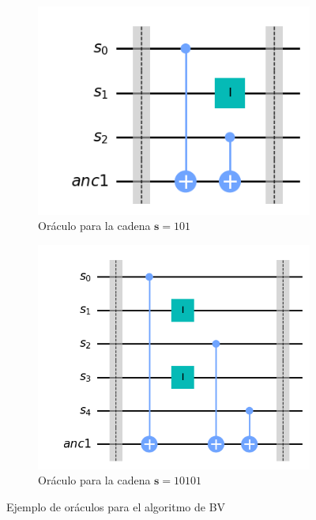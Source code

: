  \begin{figure}[H]
    \centering
    \begin{subfigure}[H]{0.4\textwidth}
        \centering
        \includegraphics[width=\textwidth]{TFG/imagenes/BVgate1.png}
        \caption{Oráculo para la cadena $\mathbf{s}=101$}
        \label{sFig:BVgate1}
    \end{subfigure}
    \hspace{10pt}
    \begin{subfigure}[H]{0.4\textwidth}
        \centering
        \includegraphics[width=\textwidth]{TFG/imagenes/BVgate2.png}
        \caption{Oráculo para la cadena $\mathbf{s}=10101$}
        \label{sFig:BVgate2}
    \end{subfigure}
        \caption{Ejemplo de oráculos para el algoritmo de BV}
    \label{FIG:BVOraculo}
 \end{figure}



